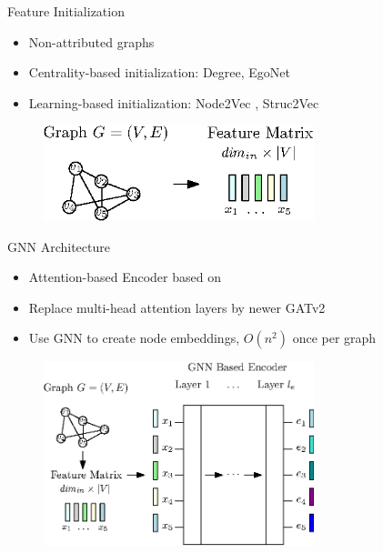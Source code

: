 \documentclass{beamer}
\begin{document}
\begin{frame}{Feature Initialization}
    \begin{itemize}
        \item<1-> Non-attributed graphs
        \item<2-> Centrality-based initialization: Degree, EgoNet
        \item<3-> Learning-based initialization: Node2Vec \cite{GroverL16}, Struc2Vec \cite{FigueiredoRS17}
    \end{itemize}
    \begin{figure}
        \centering
        \includegraphics[width=0.7\textwidth]{graphics/architecture-1.eps}
    \end{figure}
\end{frame}

\begin{frame}{GNN Architecture}
    \begin{itemize}
        \item Attention-based Encoder based on \cite{Kool2019}
        \item Replace multi-head attention layers by newer GATv2 \cite{Brody2021} 
        \item Use GNN to create node embeddings, $O(n^2)$ once per graph
    \end{itemize}
    \begin{figure}
        \centering
        \includegraphics[width=0.7\textwidth]{graphics/architecture-2.eps}
    \end{figure}
\end{frame}
\end{document}
